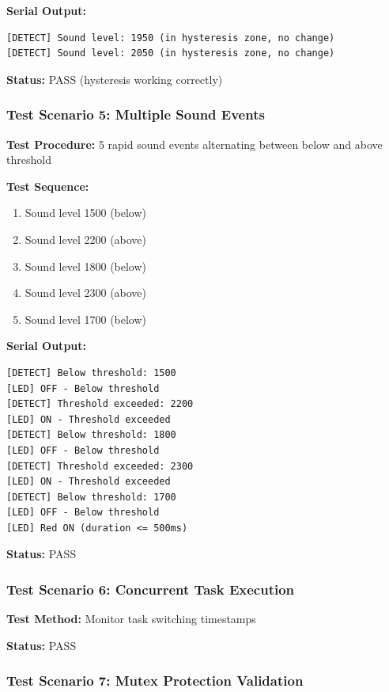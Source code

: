 \documentclass[12pt]{article}
\begin{document}
\textbf{Serial Output:}
\begin{verbatim}
[DETECT] Sound level: 1950 (in hysteresis zone, no change)
[DETECT] Sound level: 2050 (in hysteresis zone, no change)
\end{verbatim}

\textbf{Status:} PASS (hysteresis working correctly)

\subsubsection*{Test Scenario 5: Multiple Sound Events}

\textbf{Test Procedure:} 5 rapid sound events alternating between below and above threshold

\textbf{Test Sequence:}
\begin{enumerate}
    \item Sound level 1500 (below)
    \item Sound level 2200 (above)
    \item Sound level 1800 (below)
    \item Sound level 2300 (above)
    \item Sound level 1700 (below)
\end{enumerate}

\textbf{Serial Output:}
\begin{verbatim}
[DETECT] Below threshold: 1500
[LED] OFF - Below threshold
[DETECT] Threshold exceeded: 2200
[LED] ON - Threshold exceeded
[DETECT] Below threshold: 1800
[LED] OFF - Below threshold
[DETECT] Threshold exceeded: 2300
[LED] ON - Threshold exceeded
[DETECT] Below threshold: 1700
[LED] OFF - Below threshold
[LED] Red ON (duration <= 500ms)
\end{verbatim}

\textbf{Status:} PASS

\subsubsection*{Test Scenario 6: Concurrent Task Execution}



\textbf{Test Method:} Monitor task switching timestamps



\textbf{Status:} PASS



\subsubsection*{Test Scenario 7: Mutex Protection Validation}
\end{document}
